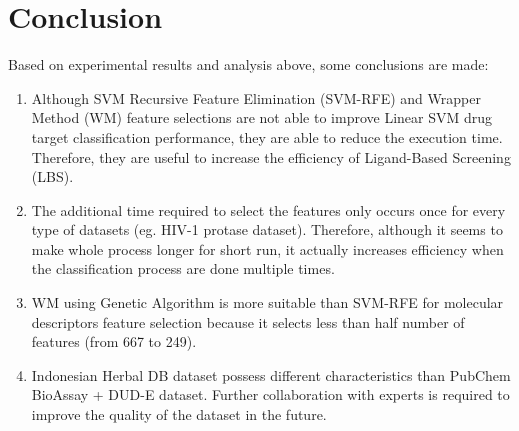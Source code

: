 \documentclass[conference]{IEEEtran}
\begin{document}
\section{Conclusion}

Based on experimental results and analysis above, some conclusions are made:

\begin{enumerate}
	\item Although SVM Recursive Feature Elimination (SVM-RFE) and Wrapper Method (WM) feature selections are not able to improve Linear SVM drug target classification performance, they are able to reduce the execution time. Therefore, they are useful to increase the efficiency of Ligand-Based Screening (LBS).
	\item The additional time required to select the features only occurs once for every type of datasets (eg. HIV-1 protase dataset). Therefore, although it seems to make whole process longer for short run, it actually increases efficiency when the classification process are done multiple times.
	\item WM using Genetic Algorithm is more suitable than SVM-RFE for molecular descriptors feature selection because it selects less than half number of features (from 667 to 249).
	\item Indonesian Herbal DB dataset possess different characteristics than PubChem BioAssay + DUD-E dataset. Further collaboration with experts is required to improve the quality of the dataset in the future.
\end{enumerate}



\end{document}
